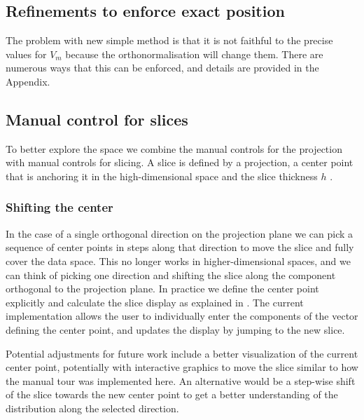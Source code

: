 \documentclass[]{interact}
\theoremstyle{plain}%
\theoremstyle{definition}
\theoremstyle{remark}
\begin{document}
\hypertarget{refinements-to-enforce-exact-position}{%
\subsection{Refinements to enforce exact
position}\label{refinements-to-enforce-exact-position}}

The problem with new simple method is that it is not faithful to the
precise values for \(V_m\) because the orthonormalisation will change
them. There are numerous ways that this can be enforced, and details are
provided in the Appendix.

\hypertarget{manual-control-for-slices}{%
\subsection{Manual control for slices}\label{manual-control-for-slices}}

To better explore the space we combine the manual controls for the
projection with manual controls for slicing. A slice is defined by a
projection, a center point that is anchoring it in the high-dimensional
space and the slice thickness \(h\) \citep{slicetour}.

\hypertarget{shifting-the-center}{%
\subsubsection{Shifting the center}\label{shifting-the-center}}

In the case of a single orthogonal direction on the projection plane we
can pick a sequence of center points in steps along that direction to
move the slice and fully cover the data space. This no longer works in
higher-dimensional spaces, and we can think of picking one direction and
shifting the slice along the component orthogonal to the projection
plane. In practice we define the center point explicitly and calculate
the slice display as explained in \citet{slicetour}. The current
implementation allows the user to individually enter the components of
the vector defining the center point, and updates the display by jumping
to the new slice.

Potential adjustments for future work include a better visualization of
the current center point, potentially with interactive graphics to move
the slice similar to how the manual tour was implemented here. An
alternative would be a step-wise shift of the slice towards the new
center point to get a better understanding of the distribution along the
selected direction.
\end{document}
